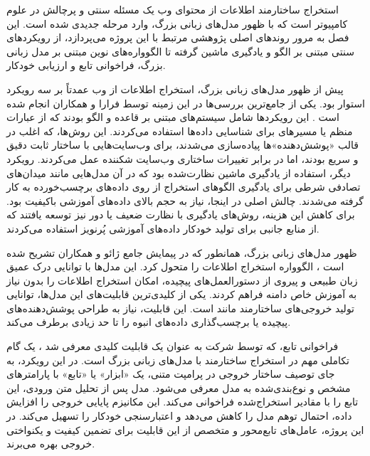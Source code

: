 

استخراج ساختارمند اطلاعات از محتوای وب یک مسئله سنتی و پرچالش در علوم کامپیوتر است که با ظهور مدل‌های زبانی بزرگ، وارد مرحله جدیدی شده است. این فصل به مرور روندهای اصلی پژوهشی مرتبط با این پروژه می‌پردازد، از رویکردهای سنتی مبتنی بر الگو و یادگیری ماشین گرفته تا الگوواره‌های نوین مبتنی بر مدل زبانی بزرگ، فراخوانی تابع و ارزیابی خودکار.


پیش از ظهور مدل‌های زبانی بزرگ، استخراج اطلاعات از وب عمدتاً بر سه رویکرد استوار بود. یکی از جامع‌ترین بررسی‌ها در این زمینه توسط فرارا و همکاران انجام شده است \cite{ferrara2014web}. این رویکردها شامل سیستم‌های مبتنی بر قاعده و الگو بودند که از عبارات منظم یا مسیرهای  برای شناسایی داده‌ها استفاده می‌کردند. این روش‌ها، که اغلب در قالب «پوشش‌دهنده»ها پیاده‌سازی می‌شدند، برای وب‌سایت‌هایی با ساختار ثابت دقیق و سریع بودند، اما در برابر تغییرات ساختاری وب‌سایت شکننده عمل می‌کردند. رویکرد دیگر، استفاده از یادگیری ماشین نظارت‌شده بود که در آن مدل‌هایی مانند میدان‌های تصادفی شرطی برای یادگیری الگوهای استخراج از روی داده‌های برچسب‌خورده به کار گرفته می‌شدند. چالش اصلی در اینجا، نیاز به حجم بالای داده‌های آموزشی باکیفیت بود. برای کاهش این هزینه، روش‌های یادگیری با نظارت ضعیف یا دور نیز توسعه یافتند که از منابع جانبی برای تولید خودکار داده‌های آموزشی پُرنویز استفاده می‌کردند.


ظهور مدل‌های زبانی بزرگ، همانطور که در پیمایش جامع ژائو و همکاران تشریح شده است \cite{zhao2023survey}، الگوواره استخراج اطلاعات را متحول کرد. این مدل‌ها با توانایی درک عمیق زبان طبیعی و پیروی از دستورالعمل‌های پیچیده، امکان استخراج اطلاعات را بدون نیاز به آموزش خاص دامنه فراهم کردند. یکی از کلیدی‌ترین قابلیت‌های این مدل‌ها، توانایی تولید خروجی‌های ساختارمند مانند  است. این قابلیت، نیاز به طراحی پوشش‌دهنده‌های پیچیده یا برچسب‌گذاری داده‌های انبوه را تا حد زیادی برطرف می‌کند.


فراخوانی تابع، که توسط شرکت  به عنوان یک قابلیت کلیدی معرفی شد \cite{open2023function}، یک گام تکاملی مهم در استخراج ساختارمند با مدل‌های زبانی بزرگ است. در این رویکرد، به جای توصیف ساختار خروجی در پرامپت متنی، یک «ابزار» یا «تابع» با پارامترهای مشخص و نوع‌بندی‌شده به مدل معرفی می‌شود. مدل پس از تحلیل متن ورودی، این تابع را با مقادیر استخراج‌شده فراخوانی می‌کند. این مکانیزم پایایی خروجی را افزایش داده، احتمال توهم مدل را کاهش می‌دهد و اعتبارسنجی خودکار را تسهیل می‌کند. در این پروژه، عامل‌های تابع‌محور و متخصص از این قابلیت برای تضمین کیفیت و یکنواختی خروجی بهره می‌برند.

